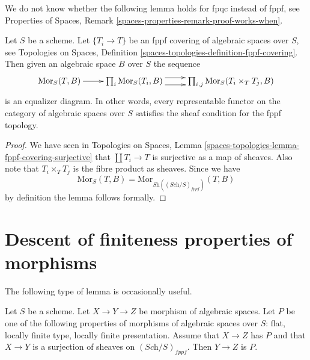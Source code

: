 \noindent
We do not know whether the following lemma holds for fpqc instead of
fppf, see
Properties of Spaces, Remark \ref{spaces-properties-remark-proof-works-when}.

\begin{lemma}
\label{lemma-fppf-universal-effective-epimorphisms}
Let $S$ be a scheme.
Let $\{T_i \to T\}$ be an fppf covering of algebraic
spaces over $S$, see
Topologies on Spaces, Definition
\ref{spaces-topologies-definition-fppf-covering}.
Then given an algebraic space $B$ over $S$ the sequence
$$
\xymatrix{
\text{Mor}_S(T, B) \ar[r] &
\prod\nolimits_i \text{Mor}_S(T_i, B) \ar@<1ex>[r] \ar@<-1ex>[r] &
\prod\nolimits_{i, j} \text{Mor}_S(T_i \times_T T_j, B)
}
$$
is an equalizer diagram.
In other words, every representable functor on the category of
algebraic spaces over $S$ satisfies the sheaf condition for the fppf topology.
\end{lemma}

\begin{proof}
We have seen in
Topologies on Spaces,
Lemma \ref{spaces-topologies-lemma-fppf-covering-surjective}
that $\coprod T_i \to T$ is surjective as a map of sheaves.
Also note that $T_i \times_T T_j$ is the fibre product as sheaves.
Since we have
$$
\text{Mor}_S(T, B) = \text{Mor}_{\textit{Sh}((\textit{Sch}/S)_{fppf})}(T, B)
$$
by definition the lemma follows formally.
\end{proof}










\section{Descent of finiteness properties of morphisms}
\label{section-descent-finiteness-morphisms}

\noindent
The following type of lemma is occasionally useful.

\begin{lemma}
\label{lemma-curiosity}
Let $S$ be a scheme. Let $X \to Y \to Z$ be morphism of algebraic spaces.
Let $P$ be one of the following properties of morphisms of algebraic spaces
over $S$:
flat, locally finite type, locally finite presentation.
Assume that $X \to Z$ has $P$ and that
$X \to Y$ is a surjection of sheaves on $(\textit{Sch}/S)_{fppf}$.
Then $Y \to Z$ is $P$.
\end{lemma}

